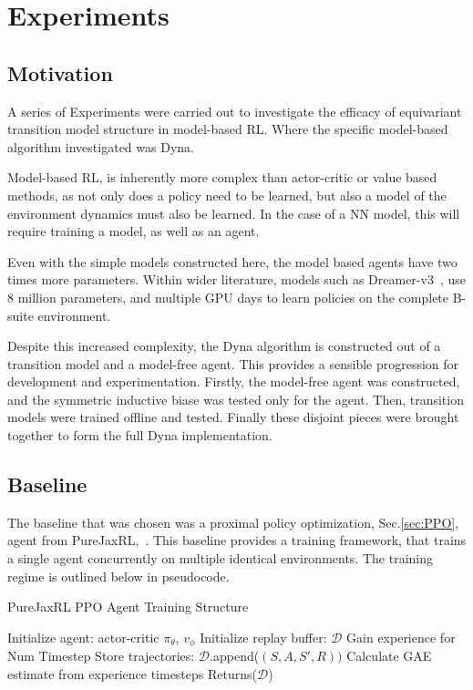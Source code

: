 \chapter{Experiments}
\section{Motivation}
A series of Experiments were carried out to investigate the efficacy of equivariant transition model structure in model-based RL. Where the specific model-based algorithm investigated was Dyna.

Model-based RL, is inherently more complex than actor-critic or value based methods, as not only does a policy need to be learned, but also a model of the environment dynamics must also be learned. In the case of a NN model, this will require training a model, as well as an agent.

Even with the simple models constructed here, the model based agents have two times more parameters. Within wider literature, models such as Dreamer-v3~\cite{hafner2023mastering}, use 8 million parameters, and multiple GPU days to learn policies on the complete B-suite environment.

Despite this increased complexity, the Dyna algorithm is constructed out of a transition model and a model-free agent. This provides a sensible progression for development and experimentation. Firstly, the model-free agent was constructed, and the symmetric inductive biase was tested only for the agent. Then, transition models were trained offline and tested. Finally these disjoint pieces were brought together to form the full Dyna implementation.

\section{Baseline}\label{sec:baseline}
The baseline that was chosen was a proximal policy optimization, Sec.\ref{sec:PPO}, agent from PureJaxRL,~\cite{lu2022discovered, schulman2015highdimensional}. This baseline provides a training framework, that trains a single agent concurrently on multiple identical environments. The training regime is outlined below in pseudocode.
\begin{algorithm}
	\caption{PureJaxRL PPO Agent Training Structure}
	\begin{algorithmic}
		\State Initialize agent: actor-critic $\pi_\theta$, $v_\phi$
		\State Initialize replay buffer: $\mathcal{D}$
		\State Gain experience for Num Timestep
		\State Store trajectories: $\mathcal{D}$.append($(S, A, S', R))$
		\State Calculate GAE estimate from experience timesteps
		\EndFor
		\EndFor
		\State Returns($\mathcal{D}$)

	\end{algorithmic}
\end{algorithm}

